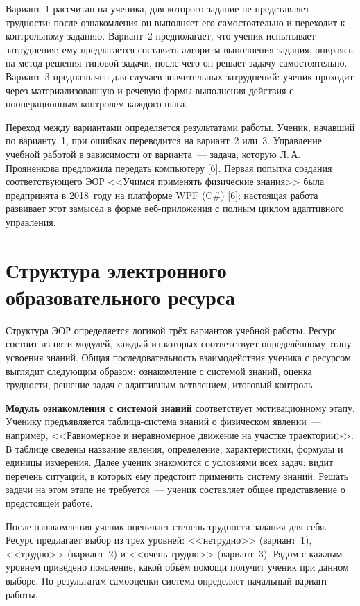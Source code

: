 \documentclass[14pt]{extarticle}
\begin{document}
Вариант~1 рассчитан на ученика, для которого задание не представляет
трудности: после ознакомления он выполняет его самостоятельно и переходит
к контрольному заданию. Вариант~2 предполагает, что ученик испытывает
затруднения; ему предлагается составить алгоритм выполнения задания,
опираясь на метод решения типовой задачи, после чего он решает задачу
самостоятельно. Вариант~3 предназначен для случаев значительных затруднений:
ученик проходит через материализованную и речевую формы выполнения действия
с пооперационным контролем каждого шага.

Переход между вариантами определяется результатами работы.
Ученик, начавший по варианту~1, при ошибках переводится
на вариант~2 или~3. Управление учебной работой в зависимости
от варианта~--- задача, которую Л.\,А.\,Прояненкова предложила
передать компьютеру [6]. Первая попытка создания соответствующего
ЭОР <<Учимся применять физические знания>> была предпринята
в 2018~году на платформе WPF (C\#) [6]; настоящая работа развивает
этот замысел в форме веб-приложения с полным циклом адаптивного
управления.



\section{Структура электронного образовательного ресурса}

Структура ЭОР определяется логикой трёх вариантов учебной работы.
Ресурс состоит из пяти модулей, каждый из которых соответствует
определённому этапу усвоения знаний. Общая последовательность
взаимодействия ученика с ресурсом выглядит следующим образом:
ознакомление с системой знаний, оценка трудности, решение задач
с адаптивным ветвлением, итоговый контроль.

\textbf{Модуль ознакомления с системой знаний} соответствует
мотивационному этапу.
Ученику предъявляется таблица-система знаний о физическом явлении~---
например, <<Равномерное и неравномерное движение на участке траектории>>.
В таблице сведены название явления, определение, характеристики, формулы
и единицы измерения. Далее ученик знакомится с условиями всех задач:
видит перечень ситуаций, в которых ему предстоит применить систему знаний.
Решать задачи на этом этапе не требуется~--- ученик составляет общее
представление о предстоящей работе.

После ознакомления ученик оценивает степень трудности задания для себя.
Ресурс предлагает выбор из трёх уровней:
<<нетрудно>> (вариант~1), <<трудно>> (вариант~2) и <<очень трудно>> (вариант~3).
Рядом с каждым уровнем приведено пояснение, какой объём помощи
получит ученик при данном выборе. По результатам самооценки система
определяет начальный вариант работы.
\end{document}
